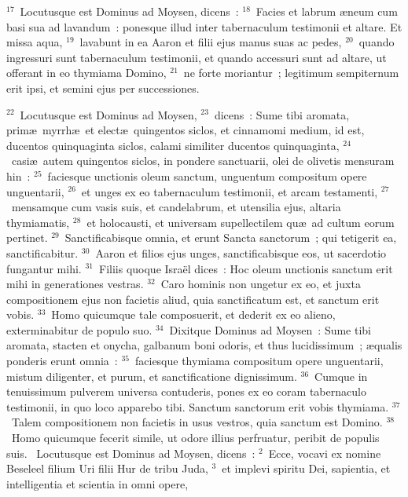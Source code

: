 ${}^{17}$~Locutusque est Dominus ad Moysen, dicens~:
${}^{18}$~Facies et labrum \ae neum cum basi sua ad lavandum~: ponesque illud inter tabernaculum testimonii et altare. Et missa aqua,
${}^{19}$~lavabunt in ea Aaron et filii ejus manus suas ac pedes,
${}^{20}$~quando ingressuri sunt tabernaculum testimonii, et quando accessuri sunt ad altare, ut offerant in eo thymiama Domino,
${}^{21}$~ne forte moriantur~; legitimum sempiternum erit ipsi, et semini ejus per successiones.


${}^{22}$~Locutusque est Dominus ad Moysen,
${}^{23}$~dicens~: Sume tibi aromata, prim\ae\ myrrh\ae\ et elect\ae\ quingentos siclos, et cinnamomi medium, id est, ducentos quinquaginta siclos, calami similiter ducentos quinquaginta,
${}^{24}$~casi\ae\ autem quingentos siclos, in pondere sanctuarii, olei de olivetis mensuram hin~:
${}^{25}$~faciesque unctionis oleum sanctum, unguentum compositum opere unguentarii,
${}^{26}$~et unges ex eo tabernaculum testimonii, et arcam testamenti,
${}^{27}$~mensamque cum vasis suis, et candelabrum, et utensilia ejus, altaria thymiamatis,
${}^{28}$~et holocausti, et universam supellectilem qu\ae\ ad cultum eorum pertinet.
${}^{29}$~Sanctificabisque omnia, et erunt Sancta sanctorum~; qui tetigerit ea, sanctificabitur.
${}^{30}$~Aaron et filios ejus unges, sanctificabisque eos, ut sacerdotio fungantur mihi.
${}^{31}$~Filiis quoque Isra\"el dices~: Hoc oleum unctionis sanctum erit mihi in generationes vestras.
${}^{32}$~Caro hominis non ungetur ex eo, et juxta compositionem ejus non facietis aliud, quia sanctificatum est, et sanctum erit vobis.
${}^{33}$~Homo quicumque tale composuerit, et dederit ex eo alieno, exterminabitur de populo suo.
${}^{34}$~Dixitque Dominus ad Moysen~: Sume tibi aromata, stacten et onycha, galbanum boni odoris, et thus lucidissimum~; \ae qualis ponderis erunt omnia~:
${}^{35}$~faciesque thymiama compositum opere unguentarii, mistum diligenter, et purum, et sanctificatione dignissimum.
${}^{36}$~Cumque in tenuissimum pulverem universa contuderis, pones ex eo coram tabernaculo testimonii, in quo loco apparebo tibi. Sanctum sanctorum erit vobis thymiama.
${}^{37}$~Talem compositionem non facietis in usus vestros, quia sanctum est Domino.
${}^{38}$~Homo quicumque fecerit simile, ut odore illius perfruatur, peribit de populis suis.
~\lettrine[lines=10,image=true,loversize=0.05,lraise=-0.03]{L}{}ocutusque est Dominus ad Moysen, dicens~:
${}^{2}$~Ecce, vocavi ex nomine Beseleel filium Uri filii Hur de tribu Juda,
${}^{3}$~et implevi spiritu Dei, sapientia, et intelligentia et scientia in omni opere,
